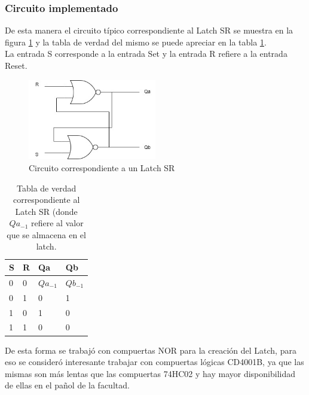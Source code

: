\subsubsection{Circuito implementado}
\noindent
De esta manera el circuito típico correspondiente al Latch SR se muestra en la figura \ref{ej6_latch_sr} y la tabla de verdad del mismo se puede apreciar en la tabla \ref{ej6_tabla_latch_sr}. \\
%
La entrada S corresponde a la entrada Set y la entrada R refiere a la entrada Reset.
%
%
%
\begin{figure}[H]
    \centering
        \centering
        \includegraphics[width=0.5\textwidth]{figs/Ej6/latchsr.jpg} %
         \caption{Circuito correspondiente a un Latch SR}
         \label{ej6_latch_sr}
\end{figure}
%
\begin{table}[H]
\caption{Tabla de verdad correspondiente al Latch SR (donde $Qa_{-1}$ refiere al valor que se almacena en el latch.}
\label{ej6_tabla_latch_sr}
\centering
\begin{tabular}{|l|l||l|l|}
\hline
S & R & Qa & Qb \\ \hline \hline
0   & 0     & $Qa_{-1}$     & $Qb_{-1}$     \\ \hline
0   & 1     & 0     & 1   \\ \hline
1   & 0    & 1     & 0   \\ \hline
1   & 1    & 0     & 0   \\ \hline 
\end{tabular}
\end{table}
%
\noindent
De esta forma se trabajó con compuertas NOR para la creación del Latch, para eso se consideró interesante trabajar con compuertas lógicas CD4001B, ya que las mismas son más lentas que las compuertas 74HC02 y hay mayor disponibilidad de ellas en el pañol de la facultad.
%
